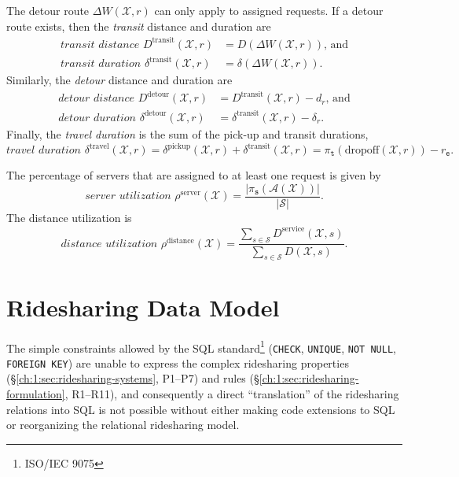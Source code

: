 The detour route $\Delta W(\mathcal{X},r)$ can only apply to assigned requests. If
a detour route exists, then
the \emph{transit} distance and duration are
\begin{align}
\label{eq:transit-distance}
\textit{transit distance }D^\textrm{transit}(\mathcal{X},r)&=D(\Delta W(\mathcal{X},r))\textrm{, and}\\
\label{eq:transit-duration}
\textit{transit duration }\delta^\textrm{transit}(\mathcal{X},r)&=\delta(\Delta W(\mathcal{X},r)).
\end{align}
Similarly, the \emph{detour} distance and duration are
\begin{align}
\label{eq:detour-distance}
\textit{detour distance }D^\textrm{detour}(\mathcal{X},r)&=D^\textrm{transit}(\mathcal{X},r)-d_r\textrm{, and}\\
\label{eq:detour-duration}
\textit{detour duration }\delta^\textrm{detour}(\mathcal{X},r)&=\delta^\textrm{transit}(\mathcal{X},r)-\delta_r.
\end{align}
Finally, the \emph{travel duration} is the sum of the pick-up and transit durations,
\begin{equation}
\label{eq:travel-duration}
\textit{travel duration }\delta^\textrm{travel}(\mathcal{X},r)=\delta^\textrm{pickup}(\mathcal{X},r)+\delta^\textrm{transit}(\mathcal{X},r)
=\pi_\texttt{t}(\textrm{dropoff}(\mathcal{X},r))-r_\texttt{e}.
\end{equation}

The percentage of servers that are assigned to at least one request is given by
\begin{equation}
\label{eq:server-utilization}
\textit{server utilization }\rho^\textrm{server}(\mathcal{X})=\frac{|\pi_\texttt{s}(\mathcal{A}(\mathcal{X}))|}{|\mathcal{S}|}.
\end{equation}
The distance utilization is
\begin{equation}
\label{eq:distance-utilization}
\textit{distance utilization }\rho^\textrm{distance}(\mathcal{X})=
\frac{\sum_{s\in\mathcal{S}}D^\textrm{service}(\mathcal{X},s)}
{\sum_{s\in\mathcal{S}}D(\mathcal{X},s)}.
\end{equation}

\section{Ridesharing Data Model}
\label{ch:1:sec:ridesharing-data-model}
The simple constraints allowed by the SQL standard\footnote{ISO/IEC 9075}
(\texttt{CHECK}, \texttt{UNIQUE}, \texttt{NOT NULL}, \texttt{FOREIGN KEY}) are
unable to express the complex ridesharing properties
(\S\ref{ch:1:sec:ridesharing-systems}, P1--P7) and rules
(\S\ref{ch:1:sec:ridesharing-formulation}, R1--R11), and consequently a direct
``translation'' of the ridesharing relations into SQL is not possible without
either making code extensions to SQL or reorganizing the relational ridesharing
model.

